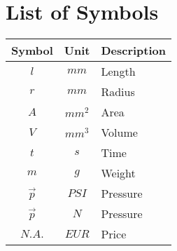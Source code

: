 
\clearpage
\chapter*{List of Symbols}

\begin{tabular}{ccl}
\textbf{Symbol} & \textbf{Unit} & \textbf{Description} \\ \hline
$l$ & $mm$ & Length \\
$r$ & $mm$ & Radius \\
$A$ & $mm^2$ & Area \\
$V$ & $mm^3$ & Volume \\
$t$ & $s$ & Time \\
$m$ & $g$ & Weight \\
$\vec{p}$ & $PSI$ & Pressure \\
$\vec{p}$ & $N$ & Pressure \\
$N.A.$ & $EUR$ & Price \\
\end{tabular}